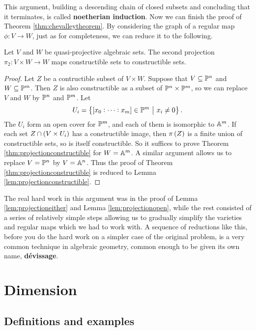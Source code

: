 This argument, building a descending chain of closed subsets and concluding that it terminates, is called \textbf{noetherian induction}. Now we can finish the proof of Theorem \ref{thm:chevalleytheorem}. By considering the graph of a regular map $ \phi : V \to W $, just as for completeness, we can reduce it to the following.

\begin{theorem}
\label{thm:projectionconstructible}
Let $ V $ and $ W $ be quasi-projective algebraic sets. The second projection $ \pi_2 : V \times W \to W $ maps constructible sets to constructible sets.
\end{theorem}

\begin{proof}
Let $ Z $ be a contructible subset of $ V \times W $. Suppose that $ V \subseteq \PP^n $ and $ W \subseteq \PP^m $. Then $ Z $ is also constructible as a subset of $ \PP^n \times \PP^m $, so we can replace $ V $ and $ W $ by $ \PP^n $ and $ \PP^m $. Let
$$ U_i = \cbr{\sbr{x_0 : \dots : x_m} \in \PP^m \st x_i \ne 0}. $$
The $ U_i $ form an open cover for $ \PP^m $, and each of them is isomorphic to $ \AA^m $. If each set $ Z \cap \br{V \times U_i} $ has a constructible image, then $ \pi\br{Z} $ is a finite union of constructible sets, so is itself constructible. So it suffices to prove Theorem \ref{thm:projectionconstructible} for $ W = \AA^m $. A similar argument allows us to replace $ V = \PP^n $ by $ V = \AA^n $. Thus the proof of Theorem \ref{thm:projectionconstructible} is reduced to Lemma \ref{lem:projectionconstructible}.
\end{proof}

The real hard work in this argument was in the proof of Lemma \ref{lem:projectioneither} and Lemma \ref{lem:projectionopen}, while the rest consisted of a series of relatively simple steps allowing us to gradually simplify the varieties and regular maps which we had to work with. A sequence of reductions like this, before you do the hard work on a simpler case of the original problem, is a very common technique in algebraic geometry, common enough to be given its own name, \textbf{d\'evissage}.

\pagebreak

\section{Dimension}

\subsection{Definitions and examples}

